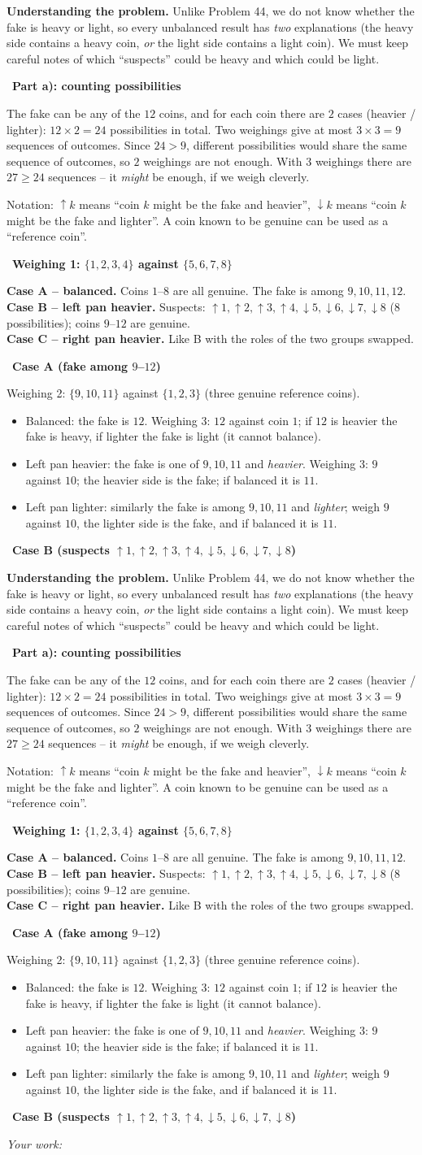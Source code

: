 \documentclass[11pt]{article}
\newif\ifsol \soltrue
\newcommand{\StuProb}[2]{\begin{probboxS}{#1}{#2}\StuProbBody\end{probboxS}}
\newcommand{\probsol}[1]{%
  \begin{lrbox}{\solmeasure}\begin{minipage}{\dimexpr\linewidth-24pt\relax}#1\end{minipage}\end{lrbox}%
  \ifsol
    \begin{solbox}#1\end{solbox}%
  \else
    \setlength{\solht}{\dimexpr\ht\solmeasure+\dp\solmeasure+0.85cm\relax}%
    \ifdim\solht<1.35cm\setlength{\solht}{1.35cm}\fi
    \ifdim\solht>\StudentMaxWork\setlength{\solht}{\StudentMaxWork}\fi
    \par\noindent\begin{minipage}{\linewidth}%
    \expandafter\StuProb\StuProbArgs
    \begin{tcolorbox}[colback=white,colframe=Line,boxrule=0.8pt,arc=5pt,
      left=8pt,right=8pt,top=4pt,bottom=4pt,height=\solht]{\footnotesize\color{Slate}\itshape\WorkWord}\end{tcolorbox}%
    \end{minipage}\par\medskip
  \fi}
\newlength{\StudentMaxWork}\setlength{\StudentMaxWork}{4.5cm}
\newcommand{\step}[2]{\par\smallskip\noindent{\bfseries\color{tmBlue!85!black}\StepWord~#1.}\ {\bfseries #2}\par\nopagebreak}
\def\WorkWord{Your work:}
\def\StepWord{Step}
\begin{document}
\probsol{
\textbf{Understanding the problem.} Unlike Problem 44, we do not know whether the fake is heavy or light, so every unbalanced result has
\emph{two} explanations (the heavy side contains a heavy coin, \emph{or} the light side contains a light coin). We must keep careful
notes of which ``suspects'' could be heavy and which could be light.
\step{1}{Part a): counting possibilities}
The fake can be any of the $12$ coins, and for each coin there are $2$ cases (heavier / lighter): $12\times 2 = 24$ possibilities in
total. Two weighings give at most $3\times 3 = 9$ sequences of outcomes. Since $24 > 9$, different possibilities would share the same
sequence of outcomes, so $2$ weighings are not enough. With $3$ weighings there are $27 \ge 24$ sequences -- it \emph{might} be enough,
if we weigh cleverly.
\begin{recallbox}Notation: $\uparrow k$ means ``coin $k$ might be the fake and heavier'', $\downarrow k$ means ``coin $k$ might be the
fake and lighter''. A coin known to be genuine can be used as a ``reference coin''.\end{recallbox}
\step{2}{Weighing 1: $\{1, 2, 3, 4\}$ against $\{5, 6, 7, 8\}$}
\textbf{Case A -- balanced.} Coins $1$--$8$ are all genuine. The fake is among $9, 10, 11, 12$.\\
\textbf{Case B -- left pan heavier.} Suspects: $\uparrow 1, \uparrow 2, \uparrow 3, \uparrow 4, \downarrow 5, \downarrow 6,
\downarrow 7, \downarrow 8$ ($8$ possibilities); coins $9$--$12$ are genuine.\\
\textbf{Case C -- right pan heavier.} Like B with the roles of the two groups swapped.
\step{3}{Case A (fake among $9$--$12$)}
Weighing 2: $\{9, 10, 11\}$ against $\{1, 2, 3\}$ (three genuine reference coins).
\begin{itemize}[leftmargin=1.4em,itemsep=0pt,topsep=1pt]
  \item Balanced: the fake is $12$. Weighing 3: $12$ against coin $1$; if $12$ is heavier the fake is heavy, if lighter the fake is
  light (it cannot balance).
  \item Left pan heavier: the fake is one of $9, 10, 11$ and \emph{heavier}. Weighing 3: $9$ against $10$; the heavier side is the
  fake; if balanced it is $11$.
  \item Left pan lighter: similarly the fake is among $9, 10, 11$ and \emph{lighter}; weigh $9$ against $10$, the lighter side is the
  fake, and if balanced it is $11$.
\end{itemize}
\step{4}{Case B (suspects $\uparrow 1, \uparrow 2, \uparrow 3, \uparrow 4, \downarrow 5, \downarrow 6, \downarrow 7, \downarrow 8$)}
}
\end{document}
